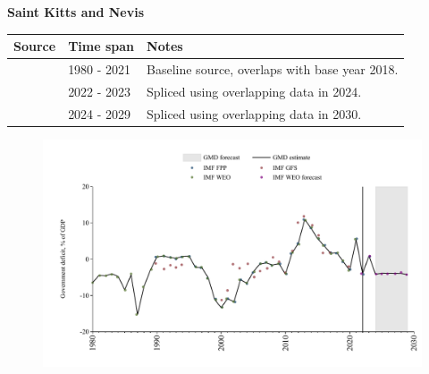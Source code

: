 \documentclass[12pt,a4paper,landscape]{article}
\begin{document}
\begin{adjustbox}{max totalsize={\paperwidth}{\paperheight},center}
\begin{minipage}[t][\textheight][t]{\textwidth}
\vspace*{0.5cm}
{}
\begin{center}
{\Large\bfseries Saint Kitts and Nevis}
\end{center}
\vspace{0.5cm}
\begin{table}[H]
\centering
\small
\begin{tabular}{|l|l|l|}
\hline
\textbf{Source} & \textbf{Time span} & \textbf{Notes} \\
\hline
\rowcolor{white}\cite{IMF_WEO}& 1980 - 2021 &Baseline source, overlaps with base year 2018.\\
\rowcolor{lightgray}\cite{IMF_FPP}& 2022 - 2023 &Spliced using overlapping data in 2024.\\
\rowcolor{white}\cite{IMF_WEO_forecast}& 2024 - 2029 &Spliced using overlapping data in 2030.\\
\hline
\end{tabular}
\end{table}
\begin{figure}[H]
\centering
\includegraphics[width=\textwidth,height=0.6\textheight,keepaspectratio]{graphs/KNA_govdef_GDP.pdf}
\end{figure}
\end{minipage}
\end{adjustbox}
\end{document}
